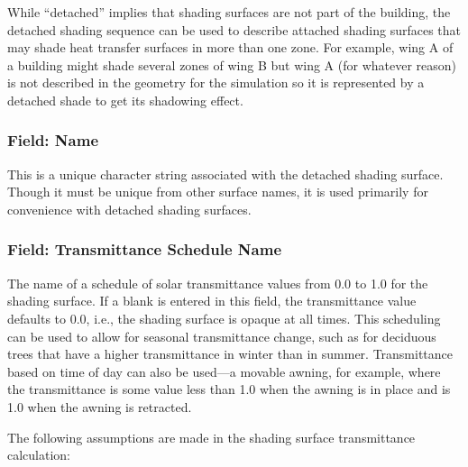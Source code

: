 While ``detached'' implies that shading surfaces are not part of the building, the detached shading sequence can be used to describe attached shading surfaces that may shade heat transfer surfaces in more than one zone. For example, wing A of a building might shade several zones of wing B but wing A (for whatever reason) is not described in the geometry for the simulation so it is represented by a detached shade to get its shadowing effect.

\subsubsection{Field: Name}\label{field-name-23-004}

This is a unique character string associated with the detached shading surface. Though it must be unique from other surface names, it is used primarily for convenience with detached shading surfaces.

\subsubsection{Field: Transmittance Schedule Name}\label{field-transmittance-schedule-name}

The name of a schedule of solar transmittance values from 0.0 to 1.0 for the shading surface. If a blank is entered in this field, the transmittance value defaults to 0.0, i.e., the shading surface is opaque at all times. This scheduling can be used to allow for seasonal transmittance change, such as for deciduous trees that have a higher transmittance in winter than in summer. Transmittance based on time of day can also be used---a movable awning, for example, where the transmittance is some value less than 1.0 when the awning is in place and is 1.0 when the awning is retracted.

The following assumptions are made in the shading surface transmittance calculation:

